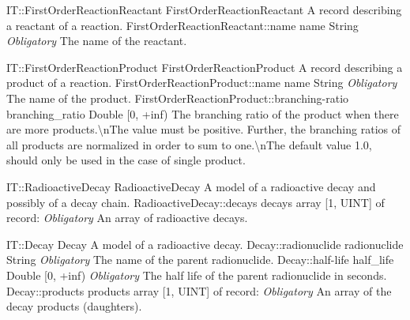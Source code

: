 \begin{RecordType}
	{IT::FirstOrderReactionReactant}
	{FirstOrderReactionReactant}
	{}%
	{}%
	{{{A record describing a reactant of a reaction.}%
}}
		\RecKey
			{FirstOrderReactionReactant::name}
			{name}
			{{String}}{}
			{ \it{Obligatory}}
			{{{The name of the reactant.}%
}}
\end{RecordType}
\begin{RecordType}
	{IT::FirstOrderReactionProduct}
	{FirstOrderReactionProduct}
	{}%
	{}%
	{{{A record describing a product of a reaction.}%
}}
		\RecKey
			{FirstOrderReactionProduct::name}
			{name}
			{{String}}{}
			{ \it{Obligatory}}
			{{{The name of the product.}%
}}
		\RecKey
			{FirstOrderReactionProduct::branching-ratio}
			{branching{\_}ratio}
			{{Double [0, +inf)}}{}
			{ }
			{{{The branching ratio of the product when there are more products.{\textbackslash}nThe value must be positive.
Further, the branching ratios of all products are normalized in order to sum to one.{\textbackslash}nThe default value 1.0, should only be used in the case of single product.}%
}}
\end{RecordType}
\begin{RecordType}
	{IT::RadioactiveDecay}
	{RadioactiveDecay}
	{}%
	{}%
	{{{A model of a radioactive decay and possibly of a decay chain.}%
}}
		\RecKey
			{RadioactiveDecay::decays}
			{decays}
			{{array [1, UINT] of }{record: }}{}
			{ \it{Obligatory}}
			{{{An array of radioactive decays.}%
}}
\end{RecordType}
\begin{RecordType}
	{IT::Decay}
	{Decay}
	{}%
	{}%
	{{{A model of a radioactive decay.}%
}}
		\RecKey
			{Decay::radionuclide}
			{radionuclide}
			{{String}}{}
			{ \it{Obligatory}}
			{{{The name of the parent radionuclide.}%
}}
		\RecKey
			{Decay::half-life}
			{half{\_}life}
			{{Double [0, +inf)}}{}
			{ \it{Obligatory}}
			{{{The half life of the parent radionuclide in seconds.}%
}}
		\RecKey
			{Decay::products}
			{products}
			{{array [1, UINT] of }{record: }}{}
			{ \it{Obligatory}}
			{{{An array of the decay products (daughters).}%
}}
\end{RecordType}
